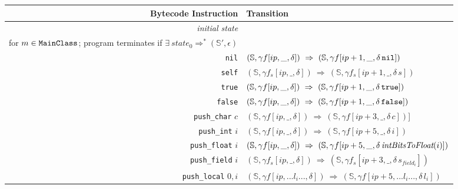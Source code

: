 \documentclass[11pt]{article}
\begin{document}
\begin{table}[tbp]
\begin{center}
\begin{tabular}[t]{|r|l|}
\hline
{\bf Bytecode Instruction} & {\bf Transition} \\
\hline
{\em initial state} &
\begin{minipage}[t]{.7\linewidth}
$state_0 = (\mathbb{S}[\text{\tt nil}, \text{\tt true}, \text{\tt false}, \text{\tt Transcript}], \text{\tt main}_{m}[0,\epsilon,\epsilon])$\\
for $m \in \text{\tt MainClass}$; program terminates if $\exists~ state_0 \Rightarrow^* (\mathbb{S'}, \epsilon)$ 
\end{minipage}\\
\hline
{\tt nil}  & $(\mathbb{S}, \gamma f[ip,\_,\delta]) ~\Rightarrow~ (\mathbb{S}, \gamma f[ip+1,\_,\delta\, \text{\tt nil}])$\\

{\tt self} & $(\mathbb{S},\gamma f_s[ip,\_,\delta]) ~\Rightarrow~ (\mathbb{S},\gamma f_s[ip+1,\_,\delta \,s])$ \\

{\tt true} & $(\mathbb{S},\gamma f[ip,\_,\delta]) ~\Rightarrow~ (\mathbb{S},\gamma f[ip+1,\_,\delta \,\text{\tt true}])$\\

{\tt false} & $(\mathbb{S},\gamma f[ip,\_,\delta]) ~\Rightarrow~ (\mathbb{S},\gamma f[ip+1,\_,\delta \,\text{\tt false}])$\\

{\tt push\_char} $c$ & $(\mathbb{S},\gamma f[ip,\_,\delta]) ~\Rightarrow~ (\mathbb{S},\gamma f[ip+3,\_,\delta \,c])$]\\

{\tt push\_int} $i$ & $(\mathbb{S},\gamma f[ip,\_,\delta]) ~\Rightarrow~ (\mathbb{S},\gamma f[ip+5,\_,\delta \,i])$\\

{\tt push\_float} $i$ & $(\mathbb{S},\gamma f[ip,\_,\delta]) ~\Rightarrow~ (\mathbb{S},\gamma f[ip+5,\_,\delta \, \text{\em intBitsToFloat}(i)])$\\

{\tt push\_field} $i$ & $(\mathbb{S},\gamma f_s[ip,\_,\delta]) ~\Rightarrow~ (\mathbb{S}, \gamma f_s[ip+3,\_,\delta \,s_{field_i}])$ \\

{\tt push\_local} $0, i$ & $(\mathbb{S},\gamma f[ip,... l_i ...,\delta]) ~\Rightarrow~ (\mathbb{S},\gamma f[ip+5,...l_i...,\delta \,l_i])$\\


\end{tabular}
\end{center}
\end{table}
\end{document}
